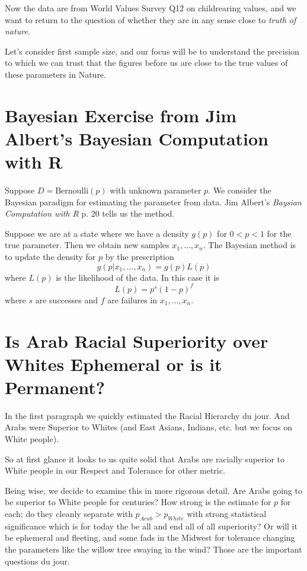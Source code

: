 \documentclass{amsart}
\begin{document}
Now the data are from World Values Survey Q12 on childrearing values, and we want to return to the question of whether they are in any sense close to {\em truth of nature}.

Let's consider first sample size, and our focus will be to understand the precision to which we can trust that the figures before us are close to the true values of these parameters in Nature.

\section{Bayesian Exercise from Jim Albert's Bayesian Computation with R}

Suppose $D=\mathrm{Bernoulli}(p)$ with unknown parameter $p$.  We consider the Bayesian paradigm for estimating the parameter from data.  Jim Albert's {\em Baysian Computation with R} p. 20 tells us the method.

Suppose we are at a state where we have a density $g(p)$ for $0<p<1$ for the true parameter.  Then we obtain new samples $x_1, \dots, x_n$.  The Bayesian method is to update the density for $p$ by the prescription
\[
g(p| x_1, \dots, x_n) = g(p) L(p)
\]
where $L(p)$ is the likelihood of the data.  In this case it is
\[
L(p) = p^s (1-p)^f
\]
where $s$ are successes and $f$ are failures in $x_1,\dots,x_n$.

\section{Is Arab Racial Superiority over Whites Ephemeral or is it Permanent?}

In the first paragraph we quickly estimated the Racial Hierarchy du jour.  And Arabs were Superior to Whites (and East Asians, Indians, etc. but we focus on White people).  

So at first glance it looks to us quite solid that Arabs are racially superior to White people in our Respect and Tolerance for other metric.  

Being wise, we decide to examine this in more rigorous detail.  Are Arabs going to be superior to White people for centuries?  How strong is the estimate for $p$ for each; do they cleanly separate with $p_{Arab}>p_{White}$ with strong statistical significance which is for today the be all and end all of all superiority?  Or will it be ephemeral and fleeting, and some fads in the Midwest for tolerance changing the parameters like the willow tree swaying in the wind?  Those are the important questions du jour.
\end{document}
